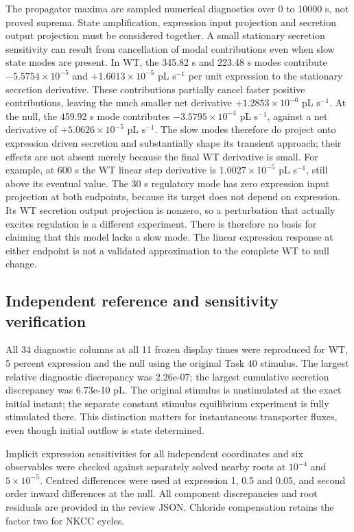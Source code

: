 The propagator maxima are sampled numerical diagnostics over 0 to 10000 s, not proved suprema. State amplification, expression input projection and secretion output projection must be considered together. A small stationary secretion sensitivity can result from cancellation of modal contributions even when slow state modes are present. In WT, the 345.82 s and 223.48 s modes contribute $-5.5754\times10^{-5}$ and $+1.6013\times10^{-5}$ pL s$^{-1}$ per unit expression to the stationary secretion derivative. These contributions partially cancel faster positive contributions, leaving the much smaller net derivative $+1.2853\times10^{-6}$ pL s$^{-1}$. At the null, the 459.92 s mode contributes $-3.5795\times10^{-4}$ pL s$^{-1}$, against a net derivative of $+5.0626\times10^{-5}$ pL s$^{-1}$. The slow modes therefore do project onto expression driven secretion and substantially shape its transient approach; their effects are not absent merely because the final WT derivative is small. For example, at 600 s the WT linear step derivative is $1.0027\times10^{-5}$ pL s$^{-1}$, still above its eventual value. The 30 s regulatory mode has zero expression input projection at both endpoints, because its target does not depend on expression. Its WT secretion output projection is nonzero, so a perturbation that actually excites regulation is a different experiment. There is therefore no basis for claiming that this model lacks a slow mode. The linear expression response at either endpoint is not a validated approximation to the complete WT to null change.

\subsection{Independent reference and sensitivity verification}

All 34 diagnostic columns at all 11 frozen display times were reproduced for WT, 5 percent expression and the null using the original Task 40 stimulus. The largest relative diagnostic discrepancy was 2.26e-07; the largest cumulative secretion discrepancy was 6.73e-10 pL. The original stimulus is unstimulated at the exact initial instant; the separate constant stimulus equilibrium experiment is fully stimulated there. This distinction matters for instantaneous transporter fluxes, even though initial outflow is state determined.

Implicit expression sensitivities for all independent coordinates and six observables were checked against separately solved nearby roots at $10^{-4}$ and $5\times10^{-5}$. Centred differences were used at expression 1, 0.5 and 0.05, and second order inward differences at the null. All component discrepancies and root residuals are provided in the review JSON. Chloride compensation retains the factor two for NKCC cycles.




